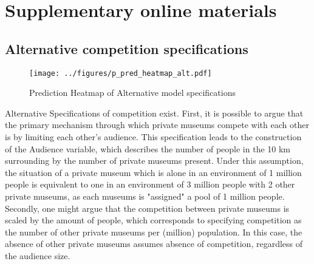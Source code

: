 \documentclass[12pt]{article}
\author{Johannes }
\date{\today}
\title{}
\begin{document}
\section*{Supplementary online materials}



\subsection*{Alternative competition specifications}



\begin{figure}[htbp]
\centering
\texttt{[image: ../figures/p\_pred\_heatmap\_alt.pdf]}
\caption{\label{fig:p_pred_heatmap_alt}Prediction Heatmap of Alternative model specifications}
\end{figure}


Alternative Specifications of competition exist.
First, it is possible to argue that the primary mechanism through which private museums compete with each other is by limiting each other's audience.
This specification leads to the construction of the Audience variable, which describes the number of people in the 10 km surrounding by the number of private museums present.
Under this assumption, the situation of a private museum which is alone in an environment of 1 million people is equivalent to one in an environment of 3 million people with 2 other private museums, as each museums is "assigned" a pool of 1 million people.
Secondly, one might argue that the competition between private museums is scaled by the amount of people, which corresponds to specifying competition as the number of other private museums per (million) population.
In this case, the absence of other private museums assumes absence of competition, regardless of the audience size.
\end{document}

